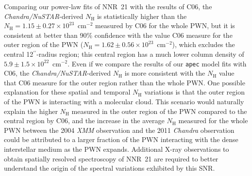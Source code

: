 \documentclass[iop,revtex4]{emulateapj}
\begin{document}
Comparing our power-law fits of NNR~21 with the results of C06, the \textit{Chandra/NuSTAR}-derived $N_{\mathrm{H}}$ is statistically higher than the $N_{\mathrm{H}} = 1.15\pm0.27\times10^{23}$~cm$^{-2}$ measured by C06 for the whole PWN, but it is consistent at better than 90\% confidence with the value C06 measure for the outer region of the PWN ($N_{\mathrm{H}} = 1.62\pm0.56\times10^{23}$~cm$^{-2}$), which excludes the central 12$^{\prime\prime}$-radius region; this central region has a much lower column density of $5.9\pm1.5\times10^{22}$~cm$^{-2}$.  Even if we compare the results of our \texttt{apec} model fits with C06, the \textit{Chandra/NuSTAR}-derived $N_{\mathrm{H}}$ is more consistent with the $N_{\mathrm{H}}$ value that C06 measure for the outer region rather than the whole PWN.  One possible explanation for these spatial and temporal $N_{\mathrm{H}}$ variations is that the outer region of the PWN is interacting with a molecular cloud.  This scenario would naturally explain the higher $N_{\mathrm{H}}$ measured in the outer region of the PWN compared to the central region by C06, and the increase in the average $N_{\mathrm{H}}$ measured for the whole PWN between the 2004 \textit{XMM} observation and the 2011 \textit{Chandra} observation could be attributed to a larger fraction of the PWN interacting with the dense interstellar medium as the PWN expands.  Additional X-ray observations to obtain spatially resolved spectroscopy of NNR~21 are required to better understand the origin of the spectral variations exhibited by this SNR.\par 

\end{document}
